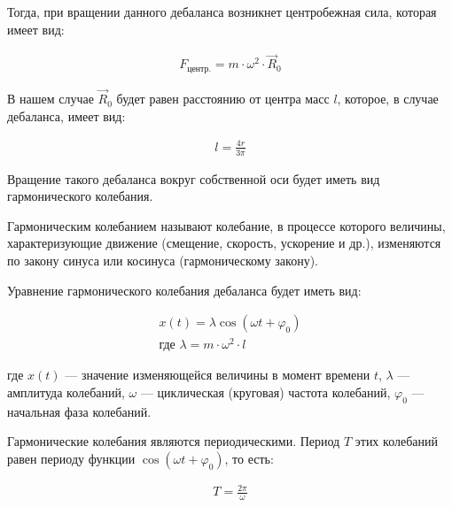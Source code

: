 Тогда, при вращении данного дебаланса возникнет центробежная сила, которая имеет вид:

\begin{equation}\label{eq:centrifugal}
    \begin{gathered}
        F_{\textrm{центр.}} = m \cdot \omega^2 \cdot \vec{R}_0
    \end{gathered}
\end{equation}

В нашем случае $\vec{R}_0$ будет равен расстоянию от центра масс $l$, которое, в случае дебаланса, имеет вид:

\begin{equation}\label{eq:distance_mass}
    \begin{gathered}
        l = \frac{4 r}{3 \pi}
    \end{gathered}
\end{equation}

Вращение такого дебаланса вокруг собственной оси будет иметь вид гармонического колебания.

\begin{definition}
    Гармоническим колебанием называют колебание, в процессе которого величины, характеризующие движение (смещение, скорость, ускорение и др.), изменяются по закону синуса или косинуса (гармоническому закону).
\end{definition}

Уравнение гармонического колебания дебаланса будет иметь вид:

\begin{equation}\label{eq:harmonic}
    \begin{gathered}
        x(t) = \lambda \cos (\omega t + \varphi_0) \\
        \textrm{где } \lambda = m \cdot \omega^2 \cdot l
    \end{gathered}
\end{equation}

где $x(t)$  — значение изменяющейся величины в момент времени $t$, $\lambda$ — амплитуда колебаний, $\omega$ — циклическая (круговая) частота колебаний, $\varphi_0$ — начальная фаза колебаний.

Гармонические колебания являются периодическими. Период $T$ этих колебаний равен периоду функции $\cos (\omega t + \varphi_0)$, то есть:

\begin{equation*}
    \begin{aligned}
        T = \frac{2 \pi}{\omega}
    \end{aligned}
\end{equation*}

